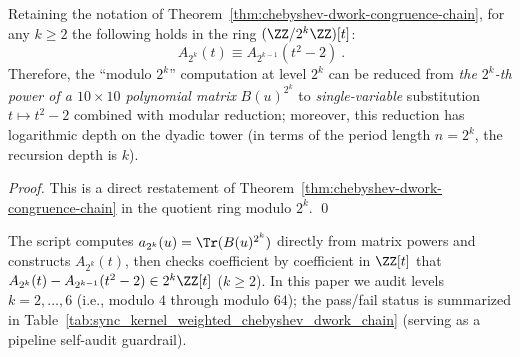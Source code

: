 \begin{corollary}\label{cor:chebyshev-dwork-matrixfree}
Retaining the notation of Theorem~\ref{thm:chebyshev-dwork-congruence-chain}, for any \(k\ge 2\) the following holds in the ring \((\ZZ/2^k\ZZ)[t]\):
\[
\boxed{\ A_{2^k}(t)\equiv A_{2^{k-1}}(t^2-2)\ }.
\]
Therefore, the ``modulo \(2^k\)'' computation at level \(2^k\) can be reduced from \emph{the \(2^k\)-th power of a \(10\times 10\) polynomial matrix} \(B(u)^{2^k}\) to \emph{single-variable} substitution \(t\mapsto t^2-2\) combined with modular reduction; moreover, this reduction has logarithmic depth on the dyadic tower (in terms of the period length \(n=2^k\), the recursion depth is \(k\)).
\end{corollary}
\begin{proof}
This is a direct restatement of Theorem~\ref{thm:chebyshev-dwork-congruence-chain} in the quotient ring modulo \(2^k\). \qed
\end{proof}

\begin{remark}\label{rem:chebyshev-dwork-audit}
The script  computes
\(
a_{2^k}(u)=\Tr(B(u)^{2^k})
\)
directly from matrix powers and constructs \(A_{2^k}(t)\), then checks coefficient by coefficient in \(\ZZ[t]\) that
\(
A_{2^k}(t)-A_{2^{k-1}}(t^2-2)\in 2^k\ZZ[t]
\)
(\(k\ge 2\)). In this paper we audit levels \(k=2,\dots,6\) (i.e., modulo \(4\) through modulo \(64\)); the pass/fail status is summarized in Table~\ref{tab:sync_kernel_weighted_chebyshev_dwork_chain} (serving as a pipeline self-audit guardrail).
\end{remark}


